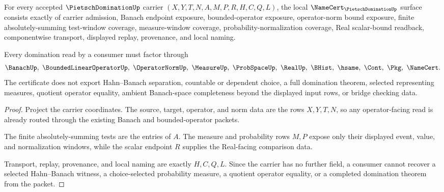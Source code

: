 \begin{theorem}
\label{thm:pietsch-domination-namecert-obligations}
For every accepted $\PietschDominationUp$ carrier $(X,Y,T,N,A,M,P,R,H,C,Q,L)$, the local $\NameCert_{\PietschDominationUp}$ surface consists exactly of carrier admission, Banach endpoint exposure, bounded-operator exposure, operator-norm bound exposure, finite absolutely-summing test-window coverage, measure-window coverage, probability-normalization coverage, Real scalar-bound readback, componentwise transport, displayed replay, provenance, and local naming.

Every domination read by a consumer must factor through
$$
\BanachUp,\ \BoundedLinearOperatorUp,\ \OperatorNormUp,\ \MeasureUp,\ \ProbSpaceUp,\ \RealUp,\ \BHist,\ \hsame,\ \Cont,\ \Pkg,\ \NameCert .
$$
The certificate does not export Hahn--Banach separation, countable or dependent choice, a full domination theorem, selected representing measures, quotient operator equality, ambient Banach-space completeness beyond the displayed input rows, or bridge checking data.
\end{theorem}
\begin{proof}
Project the carrier coordinates. The source, target, operator, and norm data are the rows $X,Y,T,N$, so any operator-facing read is already routed through the existing Banach and bounded-operator packets.

The finite absolutely-summing tests are the entries of $A$. The measure and probability rows $M,P$ expose only their displayed event, value, and normalization windows, while the scalar endpoint $R$ supplies the Real-facing comparison data.

Transport, replay, provenance, and local naming are exactly $H,C,Q,L$. Since the carrier has no further field, a consumer cannot recover a selected Hahn--Banach witness, a choice-selected probability measure, a quotient operator equality, or a completed domination theorem from the packet.
\end{proof}

\begin{closurestatus}{\PietschDominationUp}
  \theoryclosure{\seedClosure}
  \formalstatus{\unformalizedV}
\end{closurestatus}
